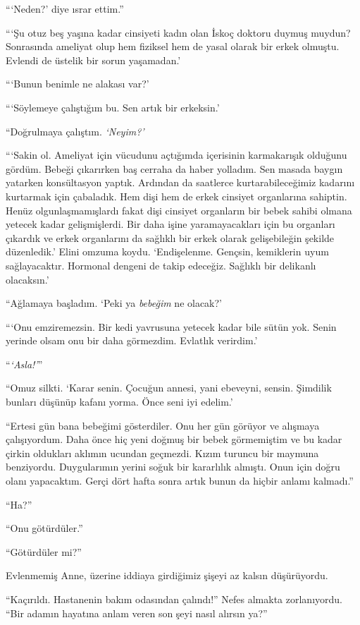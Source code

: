 ```Neden?' diye ısrar ettim.''

```Şu otuz beş yaşına kadar cinsiyeti kadın olan İskoç doktoru duymuş muydun?
Sonrasında ameliyat olup hem fiziksel hem de yasal olarak bir erkek olmuştu.
Evlendi de üstelik bir sorun yaşamadan.'

```Bunun benimle ne alakası var?'

```Söylemeye çalıştığım bu. Sen artık bir erkeksin.'

``Doğrulmaya çalıştım. \emph{`Neyim?'}

```Sakin ol. Ameliyat için vücudunu açtığımda içerisinin karmakarışık olduğunu
gördüm. Bebeği çıkarırken baş cerraha da haber yolladım. Sen masada baygın
yatarken konsültasyon yaptık. Ardından da saatlerce kurtarabileceğimiz kadarını
kurtarmak için çabaladık. Hem dişi hem de erkek cinsiyet organlarına sahiptin.
Henüz olgunlaşmamışlardı fakat dişi cinsiyet organların bir bebek sahibi olmana
yetecek kadar gelişmişlerdi. Bir daha işine yaramayacakları için bu organları
çıkardık ve erkek organlarını da sağlıklı bir erkek olarak gelişebileğin şekilde
düzenledik.' Elini omzuma koydu. `Endişelenme. Gençsin, kemiklerin uyum
sağlayacaktır. Hormonal dengeni de takip edeceğiz. Sağlıklı bir delikanlı
olacaksın.'

``Ağlamaya başladım. `Peki ya \emph{bebeğim} ne olacak?'

```Onu emziremezsin. Bir kedi yavrusuna yetecek kadar bile sütün yok. Senin
yerinde olsam onu bir daha görmezdim. Evlatlık verirdim.'

``\emph{`Asla!'}''

``Omuz silkti. `Karar senin. Çocuğun annesi, yani ebeveyni, sensin. Şimdilik
bunları düşünüp kafanı yorma. Önce seni iyi edelim.'

``Ertesi gün bana bebeğimi gösterdiler. Onu her gün görüyor ve alışmaya
çalışıyordum. Daha önce hiç yeni doğmuş bir bebek görmemiştim ve bu kadar çirkin
oldukları aklımın ucundan geçmezdi. Kızım turuncu bir maymuna benziyordu.
Duygularımın yerini soğuk bir kararlılık almıştı. Onun için doğru olanı
yapacaktım. Gerçi dört hafta sonra artık bunun da hiçbir anlamı kalmadı.''

``Ha?''

``Onu götürdüler.''

``Götürdüler mi?''

Evlenmemiş Anne, üzerine iddiaya girdiğimiz şişeyi az kalsın düşürüyordu.

``Kaçırıldı. Hastanenin bakım odasından çalındı!'' Nefes almakta zorlanıyordu.
``Bir adamın hayatına anlam veren son şeyi nasıl alırsın ya?''

